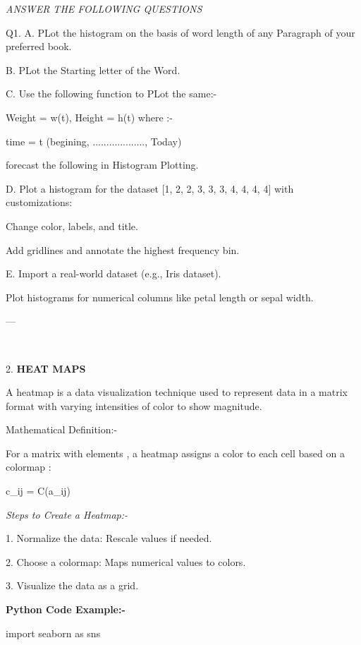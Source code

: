 \documentclass{report}
\begin{document}
\textit{ANSWER THE FOLLOWING QUESTIONS}

Q1. A. PLot the histogram on the basis of word length of any Paragraph of your preferred book.


B. PLot the Starting letter of the Word.


C. Use the following function to PLot the same:- 


    Weight = w(t),
    Height = h(t)
     where :-
     
     time = t (begining, ..................., Today)

     forecast the following in Histogram Plotting.


D. Plot a histogram for the dataset [1, 2, 2, 3, 3, 3, 4, 4, 4, 4] with customizations:

Change color, labels, and title.

Add gridlines and annotate the highest frequency bin.

E. Import a real-world dataset (e.g., Iris dataset).

Plot histograms for numerical columns like petal length or sepal width.
     
     



---

\setlength{\parskip}{1em}




\ 
\ 
\ 
\ 

2. \textbf{HEAT MAPS}



A heatmap is a data visualization technique used to represent data in a
matrix format with varying intensities of color to show magnitude.


Mathematical Definition:-


For a matrix  with elements , a heatmap assigns a color  to each cell based on a colormap :


c_{ij} = C(a_{ij})

\textit{Steps to Create a Heatmap:-}


1. Normalize the data: Rescale values if needed.


2. Choose a colormap: Maps numerical values to colors.


3. Visualize the data as a grid.


\setlength{\parskip}{1em}



\textbf{Python Code Example:-}


import seaborn as sns
\end{document}
